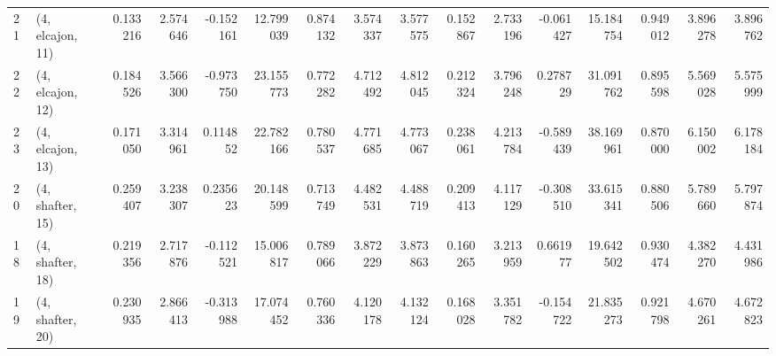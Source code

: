 \begin{tabular}{llrrrrrrrrrrrrrr}
21 &  (4, elcajon, 11) &   0.133216 &  2.574646 & -0.152161 &  12.799039 &  0.874132 &   3.574337 &  3.577575 &  0.152867 &  2.733196 & -0.061427 &   15.184754 &  0.949012 &   3.896278 &   3.896762 \\
22 &  (4, elcajon, 12) &   0.184526 &  3.566300 & -0.973750 &  23.155773 &  0.772282 &   4.712492 &  4.812045 &  0.212324 &  3.796248 &  0.278729 &   31.091762 &  0.895598 &   5.569028 &   5.575999 \\
23 &  (4, elcajon, 13) &   0.171050 &  3.314961 &  0.114852 &  22.782166 &  0.780537 &   4.771685 &  4.773067 &  0.238061 &  4.213784 & -0.589439 &   38.169961 &  0.870000 &   6.150002 &   6.178184 \\
20 &  (4, shafter, 15) &   0.259407 &  3.238307 &  0.235623 &  20.148599 &  0.713749 &   4.482531 &  4.488719 &  0.209413 &  4.117129 & -0.308510 &   33.615341 &  0.880506 &   5.789660 &   5.797874 \\
18 &  (4, shafter, 18) &   0.219356 &  2.717876 & -0.112521 &  15.006817 &  0.789066 &   3.872229 &  3.873863 &  0.160265 &  3.213959 &  0.661977 &   19.642502 &  0.930474 &   4.382270 &   4.431986 \\
19 &  (4, shafter, 20) &   0.230935 &  2.866413 & -0.313988 &  17.074452 &  0.760336 &   4.120178 &  4.132124 &  0.168028 &  3.351782 & -0.154722 &   21.835273 &  0.921798 &   4.670261 &   4.672823 \\
\bottomrule
\end{tabular}
